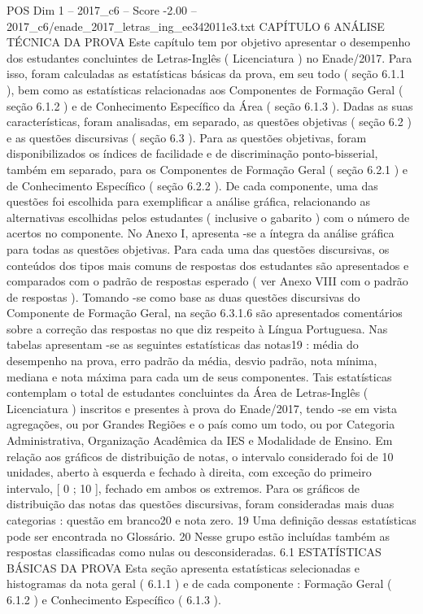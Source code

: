 \begin{textsample}{POS Dim 1 – 2017\_c6 – Score -2.00 – 2017\_c6/enade\_2017\_letras\_ing\_ee342011e3.txt}  \label{ex:f1_pos_293}
CAPÍTULO 6 ANÁLISE TÉCNICA DA PROVA Este capítulo tem por objetivo apresentar o desempenho dos estudantes concluintes de Letras-Inglês ( Licenciatura ) no Enade/2017.
Para isso, foram calculadas as estatísticas básicas da prova, em seu todo ( seção 6.1.1 ), bem como as estatísticas relacionadas aos Componentes de Formação Geral ( seção 6.1.2 ) e de Conhecimento Específico da Área ( seção 6.1.3 ).
Dadas as suas características, foram analisadas, em separado, as questões objetivas ( seção 6.2 ) e as questões discursivas ( seção 6.3 ).
Para as questões objetivas, foram disponibilizados os índices de facilidade e de discriminação ponto-bisserial, também em separado, para os Componentes de Formação Geral ( seção 6.2.1 ) e de Conhecimento Específico ( seção 6.2.2 ).
De cada componente, uma das questões foi escolhida para exemplificar a análise gráfica, relacionando as alternativas escolhidas pelos estudantes ( inclusive o gabarito ) com o número de acertos no componente.
No Anexo I, apresenta -se a íntegra da análise gráfica para todas as questões objetivas.
Para cada uma das questões discursivas, os conteúdos dos tipos mais comuns de respostas dos estudantes são apresentados e comparados com o padrão de respostas esperado ( ver Anexo VIII com o padrão de respostas ).
Tomando -se como base as duas questões discursivas do Componente de Formação Geral, na seção 6.3.1.6 são apresentados comentários sobre a correção das respostas no que diz respeito à Língua Portuguesa.
Nas tabelas apresentam -se as seguintes estatísticas das notas19 : média do desempenho na prova, erro padrão da média, desvio padrão, nota mínima, mediana e nota máxima para cada um de seus componentes.
Tais estatísticas contemplam o total de estudantes concluintes da Área de Letras-Inglês ( Licenciatura ) inscritos e presentes à prova do Enade/2017, tendo -se em vista agregações, ou por Grandes Regiões e o país como um todo, ou por Categoria Administrativa, Organização Acadêmica da IES e Modalidade de Ensino.
Em relação aos gráficos de distribuição de notas, o intervalo considerado foi de 10 unidades, aberto à esquerda e fechado à direita, com exceção do primeiro intervalo, [ 0 ; 10 ], fechado em ambos os extremos.
Para os gráficos de distribuição das notas das questões discursivas, foram consideradas mais duas categorias : questão em branco20 e nota zero. 19 Uma definição dessas estatísticas pode ser encontrada no Glossário. 20 Nesse grupo estão incluídas também as respostas classificadas como nulas ou desconsideradas. 6.1 ESTATÍSTICAS BÁSICAS DA PROVA Esta seção apresenta estatísticas selecionadas e histogramas da nota geral ( 6.1.1 ) e de cada componente : Formação Geral ( 6.1.2 ) e Conhecimento Específico ( 6.1.3 ).

\end{textsample}

